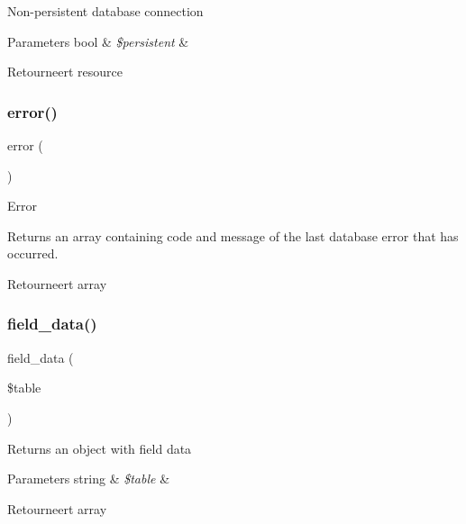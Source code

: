 Non-\/persistent database connection


\begin{DoxyParams}[1]{Parameters}
bool & {\em \$persistent} & \\
\hline
\end{DoxyParams}
\begin{DoxyReturn}{Retourneert}
resource 
\end{DoxyReturn}
\mbox{\label{class_c_i___d_b__cubrid__driver_a43b8d30b879d4f09ceb059b02af2bc02}} 
\subsubsection{\texorpdfstring{error()}{error()}}
{\footnotesize\ttfamily error (\begin{DoxyParamCaption}{ }\end{DoxyParamCaption})}

Error

Returns an array containing code and message of the last database error that has occurred.

\begin{DoxyReturn}{Retourneert}
array 
\end{DoxyReturn}
\mbox{\label{class_c_i___d_b__cubrid__driver_a90355121e1ed009e0efdbd544ab56efa}} 
\subsubsection{\texorpdfstring{field\_data()}{field\_data()}}
{\footnotesize\ttfamily field\+\_\+data (\begin{DoxyParamCaption}\item[{}]{\$table }\end{DoxyParamCaption})}

Returns an object with field data


\begin{DoxyParams}[1]{Parameters}
string & {\em \$table} & \\
\hline
\end{DoxyParams}
\begin{DoxyReturn}{Retourneert}
array 
\end{DoxyReturn}
\mbox{\label{class_c_i___d_b__cubrid__driver_a933f2cde8dc7f87875e257d0a4902e99}} 
